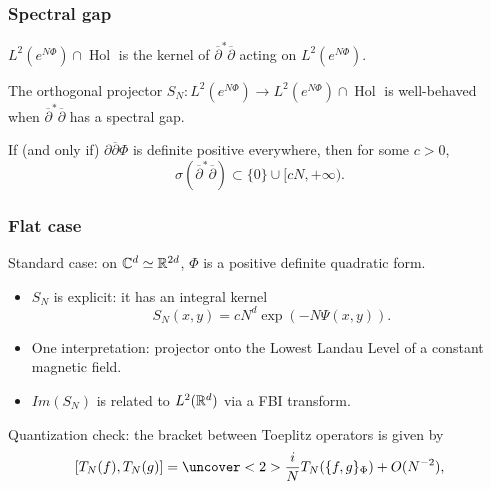 \documentclass[mathserif]{beamer}
\newcommand{\mycite}[1]{{\color{mygreen} \small #1}}
\begin{document}
\begin{frame}
  \frametitle{Spectral gap}
  $L^2(e^{N\Phi})\cap \mathop{Hol}$ is the kernel of
  $\overline{\partial}^*\overline{\partial}$ acting on $L^2(e^{N\Phi})$.

  \vfill

  The orthogonal projector $S_N:L^2(e^{N\Phi})\to L^2(e^{N\Phi})\cap \mathop{Hol}$  is well-behaved when
  $\overline{\partial}^*\overline{\partial}$ has a spectral
  gap.
  \begin{prop}[\mycite{Hörmander 1968}]
    If (and only if) $\partial\overline{\partial}\Phi$ is definite positive
    everywhere, then for some $c>0$, 
    \[
      \sigma(\overline{\partial}^*\overline{\partial})\subset
      \{0\}\cup [cN,+\infty).
      \]
    \end{prop}
  \end{frame}
  \begin{frame}
    \frametitle{Flat case}
    Standard case: on $\mathbb{C}^d\simeq \mathbb{R}^{2d}$, $\Phi$ is a positive
    definite quadratic form.
    \begin{itemize}
    \item $S_N$ is explicit: it has an integral kernel
      \[
        S_N(x,y)=cN^d\exp(-N\Psi(x,y)).
        \]
    \item One interpretation: projector onto the Lowest Landau Level
      of a constant magnetic field.
    \item $Im(S_N)$ is related to $L^2(\mathbb{R}^d)$ via a FBI transform.
    \end{itemize}
    {\color{myorange} Quantization check}: the bracket between
    Toeplitz operators is given by
    \[
      [T_N(f),T_N(g)]=\uncover<2>{\frac{i}{N}T_N(\{f,g\}_{\Phi})+O(N^{-2}),}\]
  \end{frame}
\end{document}
